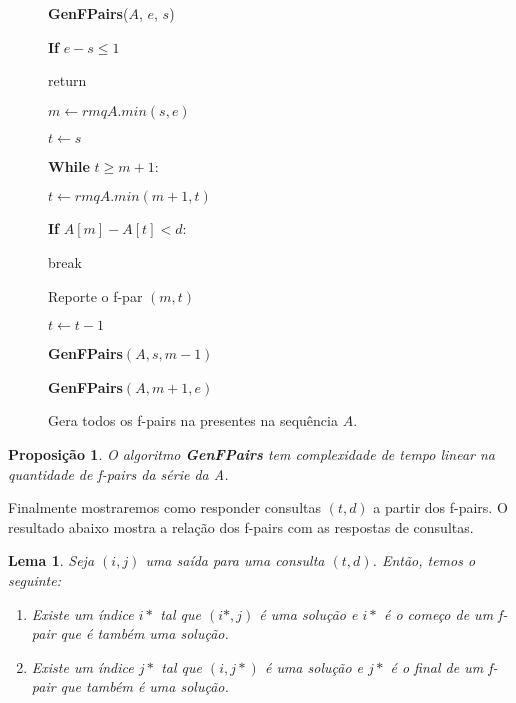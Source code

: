 \documentclass[12pt]{article}
\newtheorem{lem}[thm]{Lema}
\newtheorem{prop}[thm]{Proposição}
\begin{document}
\clearpage
\begin{figure}
\begin{framed}
{\bf GenFPairs}($A$, $e$, $s$)

\hspace{1cm} {\bf If} $e - s \le 1$

\hspace{2cm} return

\hspace{1cm} $m \leftarrow rmqA.min(s, e)$

\hspace{1cm} $t \leftarrow s$

\hspace{1cm} {\bf While} $t \ge m + 1$:

\hspace{2cm} $t \leftarrow rmqA.min(m + 1, t)$

\hspace{2cm} {\bf If} $A[m] - A[t] < d$:

\hspace{3cm} break

\hspace{2cm} Reporte o f-par $(m, t)$

\hspace{2cm} $t \leftarrow t - 1$

\hspace{1cm} {\bf GenFPairs}$(A, s, m - 1)$

\hspace{1cm} {\bf GenFPairs}$(A, m + 1, e)$

\end{framed}
\caption{Gera todos os f-pairs na presentes na sequência $A$.}
\label{gemfpair}
\end{figure}

\begin{prop}
O algoritmo {\bf GenFPairs} tem complexidade de tempo linear na quantidade
de f-pairs da série da A.
\end{prop}

Finalmente mostraremos como responder consultas $(t, d)$ a partir dos f-pairs.
O resultado abaixo mostra a relação dos f-pairs com as respostas de consultas.

\begin{lem}
\label{fundamental}
Seja $(i, j)$ uma saída para uma consulta $(t, d)$. Então, temos o seguinte:
\begin{enumerate}

\item Existe um índice $i*$ tal que $(i*, j)$ é uma solução e $i*$ é o começo
de um f-pair que é também uma solução.

\item Existe um índice $j*$ tal que $(i, j*)$ é uma solução e $j*$ é o final 
de um f-pair que também é uma solução.

\end{enumerate}
\end{lem}
\end{document}
